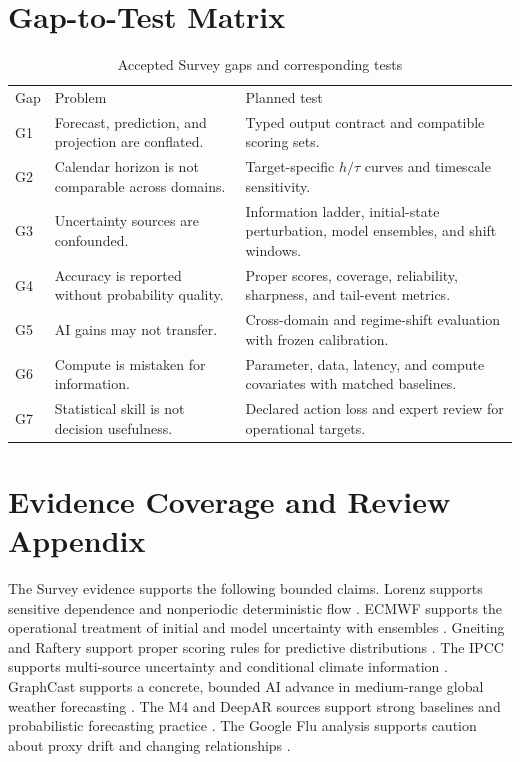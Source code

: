 \documentclass[conference]{IEEEtran}
\begin{document}
\section{Gap-to-Test Matrix}
\begin{table}[t]
\caption{Accepted Survey gaps and corresponding tests}
\label{tab:gaps}
\centering
\begin{tabular}{p{}p{}p{}}
\toprule
Gap & Problem & Planned test\\
G1 & Forecast, prediction, and projection are conflated. & Typed output contract and compatible scoring sets.\\
G2 & Calendar horizon is not comparable across domains. & Target-specific $h/\tau$ curves and timescale sensitivity.\\
G3 & Uncertainty sources are confounded. & Information ladder, initial-state perturbation, model ensembles, and shift windows.\\
G4 & Accuracy is reported without probability quality. & Proper scores, coverage, reliability, sharpness, and tail-event metrics.\\
G5 & AI gains may not transfer. & Cross-domain and regime-shift evaluation with frozen calibration.\\
G6 & Compute is mistaken for information. & Parameter, data, latency, and compute covariates with matched baselines.\\
G7 & Statistical skill is not decision usefulness. & Declared action loss and expert review for operational targets.\\
\bottomrule
\end{tabular}
\end{table}

\section{Evidence Coverage and Review Appendix}
The Survey evidence supports the following bounded claims. Lorenz supports sensitive dependence and nonperiodic deterministic flow \cite{lorenz1963,lorenz1969}. ECMWF supports the operational treatment of initial and model uncertainty with ensembles \cite{ecmwf}. Gneiting and Raftery support proper scoring rules for predictive distributions \cite{gneiting2007}. The IPCC supports multi-source uncertainty and conditional climate information \cite{ipcc2021}. GraphCast supports a concrete, bounded AI advance in medium-range global weather forecasting \cite{lam2023}. The M4 and DeepAR sources support strong baselines and probabilistic forecasting practice \cite{makridakis2018,salinas2020}. The Google Flu analysis supports caution about proxy drift and changing relationships \cite{lazer2014}.
\end{document}

